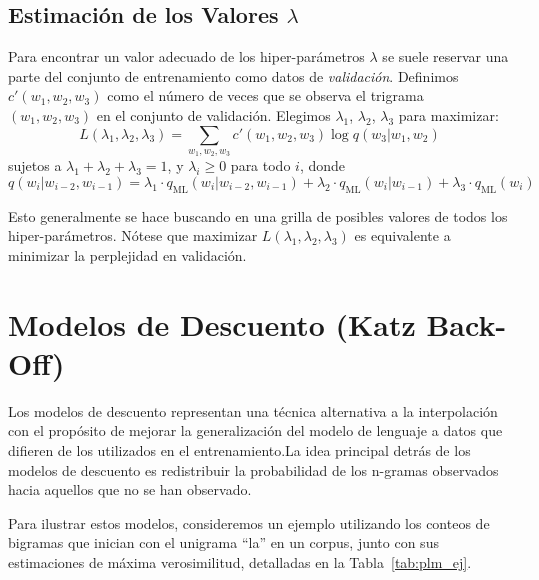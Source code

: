 \subsection{Estimación de los Valores $\lambda$}
Para encontrar un valor adecuado de los hiper-parámetros $\lambda$ se suele reservar una parte del conjunto de entrenamiento como datos de \textit{validación}. Definimos $c'(w_1, w_2, w_3)$ como el número de veces que se observa el trigrama $(w_1, w_2, w_3)$ en el conjunto de validación. Elegimos $\lambda_1$, $\lambda_2$, $\lambda_3$ para maximizar:
    \[
    L(\lambda_1, \lambda_2, \lambda_3) = \sum_{w_1,w_2,w_3} c'(w_1, w_2, w_3) \log q(w_3 | w_1, w_2)
    \]
    sujetos a $\lambda_1 + \lambda_2 + \lambda_3 = 1$, y $\lambda_i \geq 0$ para todo $i$, donde
    \[
    q(w_i | w_{i-2}, w_{i-1}) = \lambda_1 \cdot q_{\text{ML}}(w_i | w_{i-2}, w_{i-1}) + \lambda_2 \cdot q_{\text{ML}}(w_i | w_{i-1}) + \lambda_3 \cdot q_{\text{ML}}(w_i)
    \]

Esto generalmente se hace buscando en una grilla de posibles valores de todos los hiper-parámetros. Nótese que maximizar $L(\lambda_1, \lambda_2, \lambda_3)$ es equivalente a minimizar la perplejidad en validación.


\section{Modelos de Descuento (Katz Back-Off)}

Los modelos de descuento representan una técnica alternativa a la interpolación con el propósito de mejorar la generalización del modelo de lenguaje a datos que difieren de los utilizados en el entrenamiento.La idea principal detrás de los modelos de descuento es redistribuir la probabilidad de los n-gramas observados hacia aquellos que no se han observado.

Para ilustrar estos modelos, consideremos un ejemplo utilizando los conteos de bigramas que inician con el unigrama ``la'' en un corpus, junto con sus estimaciones de máxima verosimilitud, detalladas en la Tabla~\ref{tab:plm_ej}. 

